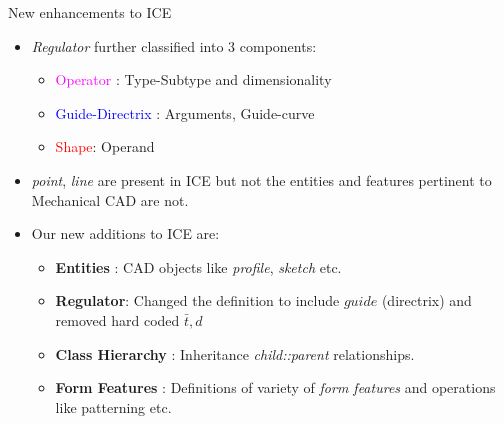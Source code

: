 \begin{frame}{New enhancements to ICE}

\begin{itemize}[noitemsep,label=\textbullet,topsep=2pt,parsep=2pt,partopsep=2pt]
\item{\em Regulator} further classified into 3 components: 
	\begin{itemize}[noitemsep,label=\textbullet,topsep=2pt,parsep=2pt,partopsep=2pt]
	\item \textcolor{magenta}{Operator} : Type-Subtype and dimensionality%
	\item \textcolor{blue}{Guide-Directrix} : Arguments, Guide-curve
	\item \textcolor{red}{Shape}: Operand
	\end{itemize}
\item {\em point}, {\em line} are present in ICE but not the entities and features pertinent to Mechanical CAD are not. 
\item Our new additions to ICE are:
	\begin{itemize}[noitemsep,label=\textbullet,topsep=2pt,parsep=2pt,partopsep=2pt]
	\item {\bf Entities} : CAD objects like {\em profile}, {\em sketch} etc.
	\item {\bf Regulator}: Changed the definition to include $guide$ (directrix) and removed hard coded $\bar{t}, d$
	\item {\bf Class Hierarchy} : Inheritance {\em child::parent} relationships. %
	\item {\bf Form Features} : Definitions of variety of {\em form features} and operations like patterning etc.
	\end{itemize}
\end{itemize}
\end{frame}


